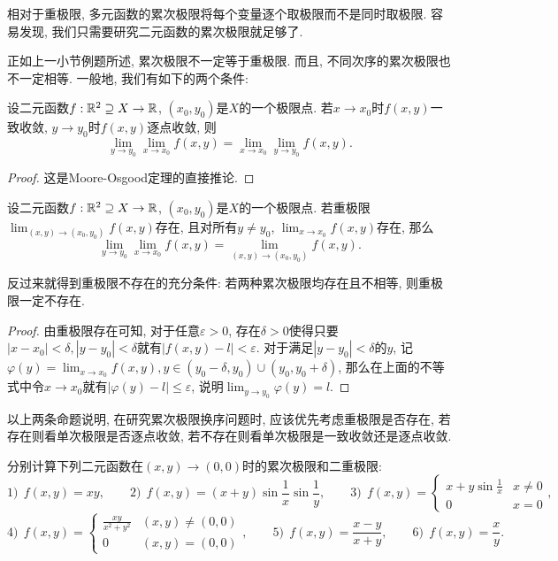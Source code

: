 相对于重极限, 多元函数的累次极限将每个变量逐个取极限而不是同时取极限. 容易发现, 我们只需要研究二元函数的累次极限就足够了. 

正如上一小节例题所述, 累次极限不一定等于重极限. 而且, 不同次序的累次极限也不一定相等. 一般地, 我们有如下的两个条件: 

\begin{proposition}{}
	设二元函数$f:\mathbb{R} ^2 \supseteq X \to \mathbb{R}$, $(x_0,y_0)$是$X$的一个极限点. 若$x \to x_0$时$f(x,y)$一致收敛, $y \to y_0$时$f(x,y)$逐点收敛, 则$$\lim_{y\to y_0} \lim_{x \to x_0} f(x,y) = \lim_{x\to x_0} \lim_{y \to y_0} f(x,y). $$
\end{proposition}
\begin{proof}
	这是Moore-Osgood定理的直接推论. 
\end{proof}

\begin{proposition}{}
	设二元函数$f:\mathbb{R} ^2 \supseteq X \to \mathbb{R}$, $(x_0,y_0)$是$X$的一个极限点. 若重极限$\lim_{(x,y) \to (x_0,y_0)} f(x,y)$存在, 且对所有$y \neq y_0$, $\lim_{x \to x_0} f(x,y)$存在, 那么$$\lim_{y\to y_0} \lim_{x \to x_0} f(x,y) = \lim_{(x,y) \to (x_0,y_0)} f(x,y).$$
\end{proposition}
\begin{remark}
	反过来就得到重极限不存在的充分条件: 若两种累次极限均存在且不相等, 则重极限一定不存在. 
\end{remark}
\begin{proof}
	由重极限存在可知, 对于任意$\varepsilon >0$, 存在$\delta >0$使得只要$|x-x_0|<\delta,|y-y_0|<\delta$就有$|f(x,y)-l|<\varepsilon$. 对于满足$|y-y_0|<\delta$的$y$, 记$\varphi (y) = \lim_{x \to x_0} f(x,y), y \in (y_0-\delta ,y_0) \cup (y_0,y_0 + \delta)$, 那么在上面的不等式中令$x \to x_0$就有$|\varphi (y) - l | \leq \varepsilon$, 说明$\lim_{y \to y_0} \varphi (y) = l$. 
\end{proof}

以上两条命题说明, 在研究累次极限换序问题时, 应该优先考虑重极限是否存在, 若存在则看单次极限是否逐点收敛, 若不存在则看单次极限是一致收敛还是逐点收敛. 

\begin{example}
	分别计算下列二元函数在$(x,y) \to (0,0)$时的累次极限和二重极限: $$1)~~f(x,y) = xy,\qquad 2)~~f(x,y) = (x+y)\sin \frac{1}{x} \sin \frac{1}{y},\qquad 3)~~f(x,y) = \begin{cases} x+y\sin \frac{1}{x} & x\neq 0 \\ 0 & x=0 \end{cases}, $$
	$$4)~~f(x,y) = \begin{cases} \frac{xy}{x^2+y^2} &  (x,y) \neq (0,0) \\ 0 &  (x,y) = (0,0) \end{cases},\qquad 5)~~f(x,y)=\frac{x-y}{x+y},\qquad 6)~~f(x,y)=\frac{x}{y}. $$
\end{example}

